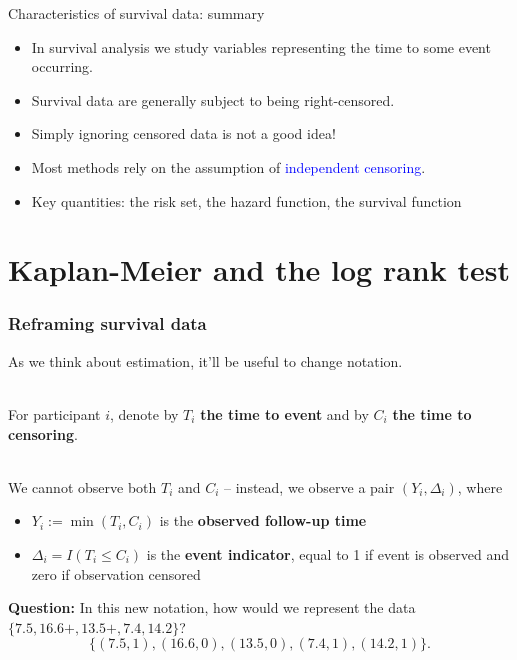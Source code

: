 \documentclass[10pt,t]{beamer}
\begin{document}
\begin{frame}{Characteristics of survival data: summary}
	\begin{itemize}
		\item In survival analysis we study variables representing the time to some event occurring.
		
		\medskip
		
		\item Survival data are generally subject to being right-censored.
		
		\medskip
		
		\item Simply ignoring censored data is not a good idea!
		
		\medskip
		
		\item Most methods rely on the assumption of \textcolor{blue}{independent censoring}.
		
		\medskip
		
		\item Key quantities: the risk set, the hazard function, the survival function
	\end{itemize}
\end{frame}


\section{Kaplan-Meier and the log rank test}

\begin{frame}
\frametitle{Reframing survival data}

\vspace{-5 mm}

As we think about estimation, it'll be useful to change notation.
\\ ~\ 

For participant $i$, denote by $T_i$ \textbf{the time to event} and by $C_i$ \textbf{the time to censoring}.   
\\ ~\ 

We cannot observe both $T_i$ and $C_i$ -- instead, we observe a pair $(Y_i, \Delta_i)$, where   
\begin{itemize}
	\medskip
\item $Y_i := \min(T_i, C_i)$ is the \textbf{observed follow-up time}  

\medskip
\item $\Delta_i = I(T_i \leq C_i)$ is the \textbf{event indicator}, equal to 1 if event is observed and zero if observation censored
\end{itemize}
\medskip

\textbf{Question:} In this new notation, how would we represent the data $\{7.5, 16.6+, 13.5+, 7.4, 14.2\}$?  
\[\{(7.5, 1), (16.6, 0), (13.5, 0), (7.4, 1), (14.2, 1)\}.\]
\end{frame}
\end{document}
